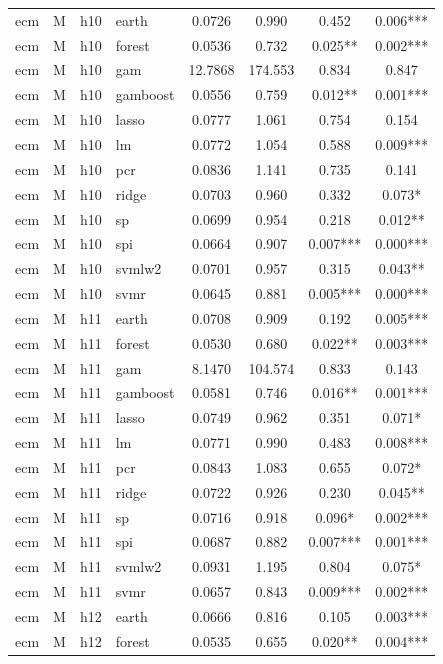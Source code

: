 \begin{ThreePartTable}
\begin{longtable}[t]{llclcccc}
\addlinespace
ecm & M & h10 & earth & 0.0726 & 0.990 & 0.452 & 0.006***\\
ecm & M & h10 & forest & 0.0536 & 0.732 & 0.025** & 0.002***\\
ecm & M & h10 & gam & 12.7868 & 174.553 & 0.834 & 0.847\\
ecm & M & h10 & gamboost & 0.0556 & 0.759 & 0.012** & 0.001***\\
ecm & M & h10 & lasso & 0.0777 & 1.061 & 0.754 & 0.154\\
ecm & M & h10 & lm & 0.0772 & 1.054 & 0.588 & 0.009***\\
ecm & M & h10 & pcr & 0.0836 & 1.141 & 0.735 & 0.141\\
ecm & M & h10 & ridge & 0.0703 & 0.960 & 0.332 & 0.073*\\
ecm & M & h10 & sp & 0.0699 & 0.954 & 0.218 & 0.012**\\
ecm & M & h10 & spi & 0.0664 & 0.907 & 0.007*** & 0.000***\\
ecm & M & h10 & svmlw2 & 0.0701 & 0.957 & 0.315 & 0.043**\\
ecm & M & h10 & svmr & 0.0645 & 0.881 & 0.005*** & 0.000***\\
\addlinespace
ecm & M & h11 & earth & 0.0708 & 0.909 & 0.192 & 0.005***\\
ecm & M & h11 & forest & 0.0530 & 0.680 & 0.022** & 0.003***\\
ecm & M & h11 & gam & 8.1470 & 104.574 & 0.833 & 0.143\\
ecm & M & h11 & gamboost & 0.0581 & 0.746 & 0.016** & 0.001***\\
ecm & M & h11 & lasso & 0.0749 & 0.962 & 0.351 & 0.071*\\
ecm & M & h11 & lm & 0.0771 & 0.990 & 0.483 & 0.008***\\
ecm & M & h11 & pcr & 0.0843 & 1.083 & 0.655 & 0.072*\\
ecm & M & h11 & ridge & 0.0722 & 0.926 & 0.230 & 0.045**\\
ecm & M & h11 & sp & 0.0716 & 0.918 & 0.096* & 0.002***\\
ecm & M & h11 & spi & 0.0687 & 0.882 & 0.007*** & 0.001***\\
ecm & M & h11 & svmlw2 & 0.0931 & 1.195 & 0.804 & 0.075*\\
ecm & M & h11 & svmr & 0.0657 & 0.843 & 0.009*** & 0.002***\\
\addlinespace
ecm & M & h12 & earth & 0.0666 & 0.816 & 0.105 & 0.003***\\
ecm & M & h12 & forest & 0.0535 & 0.655 & 0.020** & 0.004***\\

\end{longtable}
\end{ThreePartTable}
